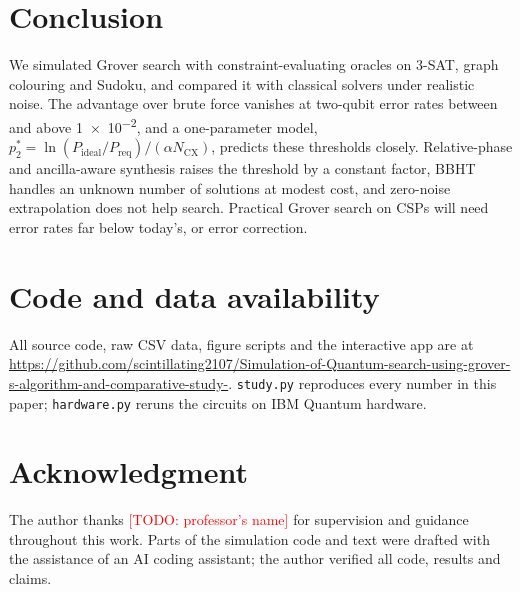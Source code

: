\documentclass[conference]{IEEEtran}
\newcommand{\todo}[1]{\textcolor{red}{[TODO: #1]}}
\begin{document}
\section{Conclusion}
We simulated Grover search with constraint-evaluating oracles on 3-SAT, graph colouring and Sudoku, and compared it with classical solvers under realistic noise. The advantage over brute force vanishes at two-qubit error rates between \thrLowest{} and above \num{1e-2}, and a one-parameter model, $p_2^*=\ln(P_\text{ideal}/P_\text{req})/(\alpha N_\text{CX})$, predicts these thresholds closely. Relative-phase and ancilla-aware synthesis raises the threshold by a constant factor, BBHT handles an unknown number of solutions at modest cost, and zero-noise extrapolation does not help search. Practical Grover search on CSPs will need error rates far below today's, or error correction.

\section*{Code and data availability}
All source code, raw CSV data, figure scripts and the interactive app are at \url{https://github.com/scintillating2107/Simulation-of-Quantum-search-using-grover-s-algorithm-and-comparative-study-}. \texttt{study.py} reproduces every number in this paper; \texttt{hardware.py} reruns the circuits on IBM Quantum hardware.

\section*{Acknowledgment}
The author thanks \todo{professor's name} for supervision and guidance throughout this work. Parts of the simulation code and text were drafted with the assistance of an AI coding assistant; the author verified all code, results and claims.



\end{document}

